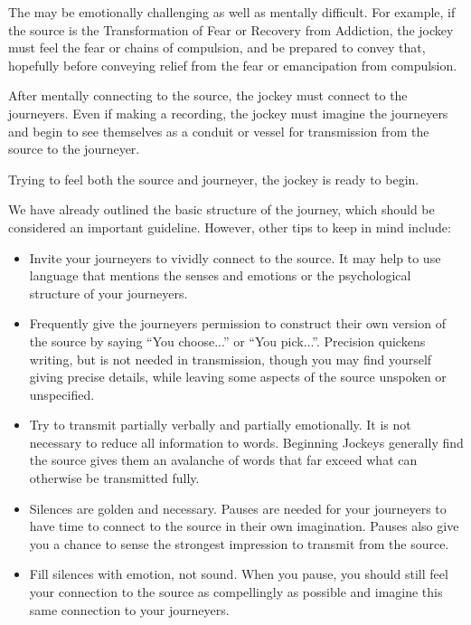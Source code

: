 \documentclass[12pt]{book}
\begin{document}
The may be emotionally challenging as well as mentally difficult. For example, if the source is the Transformation of Fear or Recovery from Addiction, the jockey must feel the fear or chains of compulsion, and be prepared to convey that, hopefully before conveying relief from the fear or emancipation from compulsion.
					
After mentally connecting to the source, the jockey must connect to the journeyers. Even if making a recording, the jockey must imagine the journeyers and begin to see themselves as a conduit or vessel for transmission from the source to the journeyer.
					
Trying to feel both the source and journeyer, the jockey is ready to begin.
					
We have already outlined the basic structure of the journey, which should be considered an important guideline. However, other tips to keep in mind include:
					

	\begin{itemize}
\item 

Invite your journeyers to vividly connect to the source. It may help to use language that mentions the senses and emotions or the psychological structure of your journeyers.
						
						 					\item 		
Frequently give the journeyers permission to construct their own version of the source by saying “You choose...” or “You pick...”. Precision quickens writing, but is not needed in transmission, though you may find yourself giving precise details, while leaving some aspects of the source unspoken or unspecified.
						
						 					\item 		
Try to transmit partially verbally and partially emotionally. It is not necessary to reduce all information to words. Beginning Jockeys  generally find the source gives them an avalanche of words that far exceed what can otherwise  be transmitted fully.
						
						 					\item 		
Silences are golden and necessary. Pauses are needed for your journeyers to have time to connect to the source in their own imagination.
Pauses also give you a chance to sense the strongest impression to transmit from the source.

\item 
Fill silences with emotion, not sound. When you pause, you should still feel your connection to the source as compellingly as possible and imagine this same connection to your journeyers.
\end{itemize}
  
\end{document}

